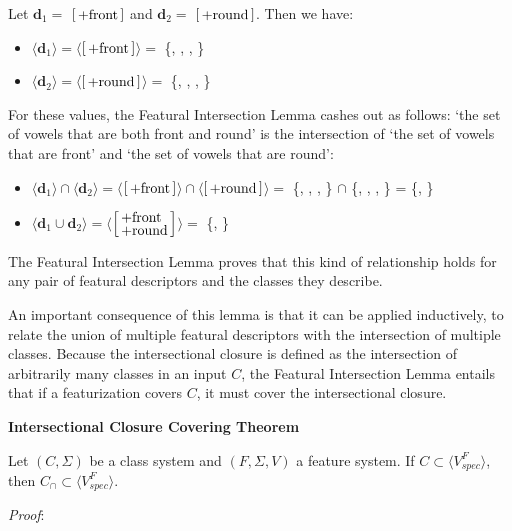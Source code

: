 \documentclass[12pt, oneside]{article}   	%
\newenvironment{clump}
{
	\edef\myindent{\the\parindent}
	\noindent\begin{minipage}{\textwidth}
	\setlength\parindent{\myindent}\fussy
}
{
	\end{minipage}
}
\newcommand{\featmat}[1]
{$\begin{bsmallmatrix*}[l]\text{\normalsize #1}\end{bsmallmatrix*}$}
\newcommand{\featmattwo}[2]{$\begin{bsmallmatrix*}[l]\text{\normalsize #1}\\\text{\normalsize #2}\end{bsmallmatrix*}$}
\begin{document}
\noindent Let $\mathbf{d}_1 =$ \featmat{+front} and $\mathbf{d}_2 =$ \featmat{+round}. Then we have: \begin{itemize}
    \item $\langle \mathbf{d}_1 \rangle = \langle$\featmat{+front}$\rangle =$ \{\textipa{\o}, , , \}
    \item $\langle \mathbf{d}_2 \rangle = \langle$\featmat{+round}$\rangle =$ \{\textipa{\o}, , , \}
    \end{itemize}
\noindent For these values, the Featural Intersection Lemma cashes out as follows: `the set of vowels that are both front and round' is the intersection of `the set of vowels that are front' and `the set of vowels that are round':
 
\begin{itemize}
    \item $\langle \mathbf{d}_1 \rangle \cap \langle \mathbf{d}_2 \rangle =  \langle$\featmat{+front}$\rangle \cap \langle$\featmat{+round}$\rangle =$ \{\textipa{\o}, , , \} $\cap$ \{\textipa{\o}, , , \} = \{\textipa{\o}, \}
    \item $\langle \mathbf{d}_1 \cup \mathbf{d}_2 \rangle = \langle$\featmattwo{+front}{+round}$\rangle =$ \{\textipa{\o}, \}
\end{itemize}

\noindent The Featural Intersection Lemma proves that this kind of relationship holds for any pair of featural descriptors and the classes they describe.

An important consequence of this lemma is that it can be applied inductively, to relate the union of multiple featural descriptors with the intersection of multiple classes. Because the intersectional closure is defined as the intersection of arbitrarily many classes in an input $C$, the Featural Intersection Lemma entails that if a featurization covers $C$, it must cover the intersectional closure.

\begin{clump}
\vspace{\baselineskip} \noindent \textbf{Intersectional Closure Covering Theorem}

\noindent Let $(C, \Sigma)$ be a class system and $(F, \Sigma, V)$ a feature system. If $C \subset \langle V_{spec}^F \rangle$, then $C_\cap \subset\langle V_{spec}^F \rangle $.
\end{clump}
\noindent \textit{Proof}:
\end{document}
